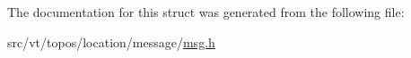 The documentation for this struct was generated from the following file\+:\begin{DoxyCompactItemize}
\item 
src/vt/topos/location/message/\hyperlink{msg_8h}{msg.\+h}\end{DoxyCompactItemize}
